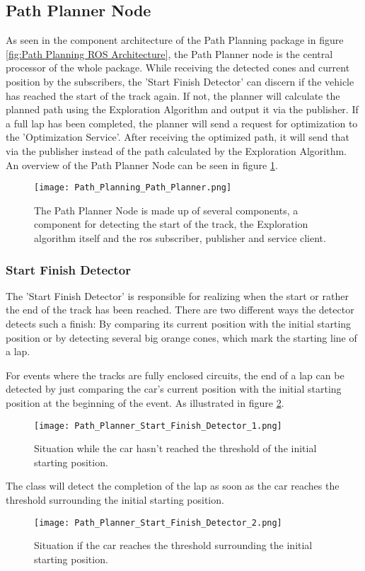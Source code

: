 \subsection{Path Planner Node} \label{sec:Path Planner Node}
As seen in the component architecture of the Path Planning package in figure \ref{fig:Path Planning ROS Architecture}, the Path Planner node is the central processor of the whole package.
While receiving the detected cones and current position by the subscribers, the 'Start Finish Detector' can discern if the vehicle has reached the start of the track again. If not, the planner will calculate the planned path using the Exploration Algorithm and output it via the publisher. If a full lap has been completed, the planner will send a request for optimization to the 'Optimization Service'. After receiving the optimized path, it will send that via the publisher instead of the path calculated by the Exploration Algorithm. An overview of the Path Planner Node can be seen in figure \ref{fig:Path Planning Path Planner Node}.
\begin{figure}[H]
    \centering
    \texttt{[image: Path\_Planning\_Path\_Planner.png]}
    \caption{The Path Planner Node is made up of several components, a component for detecting the start of the track, the Exploration algorithm itself and the \acrshort{ros} subscriber, publisher and service client.}
    \label{fig:Path Planning Path Planner Node}
\end{figure}

\subsubsection{Start Finish Detector} \label{sec:Start Finish Detector}
The 'Start Finish Detector' is responsible for realizing when the start or rather the end of the track has been reached. There are two different ways the detector detects such a finish: By comparing its current position with the initial starting position or by detecting several big orange cones, which mark the starting line of a lap.

For events where the tracks are fully enclosed circuits, the end of a lap can be detected by just comparing the car's current position with the initial starting position at the beginning of the event. As illustrated in figure \ref{fig:Path Planner Start Finish Detector 1}.
\begin{figure}[H]
    \centering
    \texttt{[image: Path\_Planner\_Start\_Finish\_Detector\_1.png]}
    \caption{Situation while the car hasn't reached the threshold of the initial starting position.}
    \label{fig:Path Planner Start Finish Detector 1}
\end{figure}
The class will detect the completion of the lap as soon as the car reaches the threshold surrounding the initial starting position.
\begin{figure}[H]
    \centering
    \texttt{[image: Path\_Planner\_Start\_Finish\_Detector\_2.png]}
    \caption{Situation if the car reaches the threshold surrounding the initial starting position.}
    \label{fig:Path Planner Start Finish Detector 2}
\end{figure}

